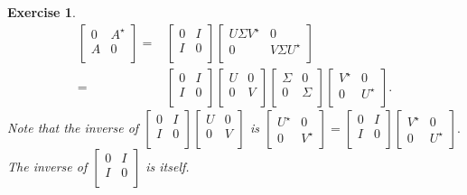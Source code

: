 \documentclass[paper=a4, fontsize=11pt]{scrartcl} %
\numberwithin{equation}{section} %
\numberwithin{figure}{section} %
\numberwithin{table}{section} %
\newtheorem{exercise}{Exercise}
\numberwithin{exercise}{section}
\begin{document}
\begin{exercise}
\begin{align*}
\begin{bmatrix}
0 & A^{\star} \\
A & 0 \\
\end{bmatrix} =& \begin{bmatrix}
0 & I \\
I & 0 \\
\end{bmatrix} \begin{bmatrix}
U\Sigma V^{\star}  & 0 \\
 0 & V\Sigma U^{\star} \\
\end{bmatrix} \\
{}=&  \begin{bmatrix}
0 & I \\
I & 0 \\
\end{bmatrix} \begin{bmatrix}
U  & 0 \\
 0 & V \\
\end{bmatrix} \begin{bmatrix}
\Sigma & 0 \\
0 & \Sigma \\
\end{bmatrix}
\begin{bmatrix}
V^{\star}  & 0 \\
0 & U^{\star}\\
\end{bmatrix}.
\end{align*}
Note that the inverse of  $\begin{bmatrix}
0 & I \\
I & 0 \\
\end{bmatrix} \begin{bmatrix}
U  & 0 \\
 0 & V \\
\end{bmatrix}$ is $\begin{bmatrix}
U^{\star} & 0 \\
0 & V^{\star}
\end{bmatrix} =\begin{bmatrix}
0 & I \\
I & 0 \\
\end{bmatrix} \begin{bmatrix}
V^{\star} & 0 \\
0 & U^{\star}
\end{bmatrix} .$ 
The inverse of $\begin{bmatrix}
0 & I \\
I  & 0 \\
\end{bmatrix}$ is itself.


\end{exercise}
\end{document}
